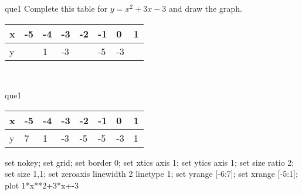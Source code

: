 \documentclass[13.5pt, varwidth=true]{beamer}
\begin{document}
\begin{frame}[shrink=19,fragile]
	\begin{beamercolorbox}[rounded=true, left, shadow=true,wd=14.8cm]{que1}
		 Complete this table for $y = x^{2} + 3x - 3$ and draw the graph. \\[0.3cm] \renewcommand{\arraystretch}{1.2}\begin{tabular}{|C|C|C|C|C|C|C|C|} \hline x & -5 & -4 & -3 & -2 & -1 & 0 & 1 \\ \hline y &  & 1 & -3 &  & -5 & -3 & \\ \hline \end{tabular}\\[0.3cm]
	\end{beamercolorbox}
\end{frame}
\begin{frame}[shrink=19,fragile]
	\begin{beamercolorbox}[rounded=true, left, shadow=true,wd=14.8cm]{que1}
		\renewcommand{\arraystretch}{1.2}\begin{tabular}{|C|C|C|C|C|C|C|C|} \hline x & -5 & -4 & -3 & -2 & -1 & 0 & 1 \\ \hline y & 7 & 1 & -3 & -5 & -5 & -3 & 1\\ \hline \end{tabular}\begin{gnuplot}[terminal=pdf] set nokey; set grid; set border 0; set xtics axis 1; set ytics axis 1; set size ratio 2; set size 1,1; set zeroaxis linewidth 2 linetype 1; set yrange [-6:7]; set xrange [-5:1]; plot 1*x**2+3*x+-3 \end{gnuplot}
	\end{beamercolorbox}
\end{frame}
\end{document}
